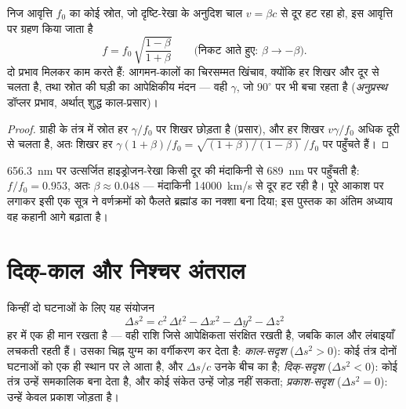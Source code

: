 \begin{proposition}[अनुदैर्घ्य डॉप्लर प्रभाव]\label{prop:b3:relativistic-kinematics:doppler}
निज आवृत्ति $f_0$ का कोई स्रोत, जो दृष्टि-रेखा के अनुदिश चाल
$v = \beta c$ से दूर हट रहा हो, इस आवृत्ति पर ग्रहण किया जाता है
\[
f = f_0\,\sqrt{\frac{1 - \beta}{1 + \beta}}
\qquad
\text{(निकट आते हुए: } \beta \to -\beta\text{)} .
\]
दो प्रभाव मिलकर काम करते हैं: आगमन-कालों का चिरसम्मत खिंचाव, क्योंकि
हर शिखर और दूर से चलता है, तथा स्रोत की घड़ी का आपेक्षिकीय मंदन ---
वही $\gamma$, जो $90^\circ$ पर भी बचा रहता है (\emph{अनुप्रस्थ}
डॉप्लर प्रभाव, अर्थात् शुद्ध काल-प्रसार)।
\end{proposition}

\begin{proof}
ग्राही के तंत्र में स्रोत हर
$\gamma/f_0$ पर शिखर छोड़ता है (प्रसार), और हर शिखर $v\gamma/f_0$ अधिक
दूरी से चलता है, अतः शिखर हर $\gamma(1 + \beta)/f_0 = \sqrt{(1+\beta)/
(1-\beta)}\,/f_0$ पर पहुँचते हैं।
\end{proof}

\begin{example}[मंदाकिनियों का दूर हटना]\label{ex:b3:relativistic-kinematics:redshift}
\qty{656.3}{nm} पर उत्सर्जित हाइड्रोजन-रेखा किसी दूर की मंदाकिनी से
\qty{689}{nm} पर पहुँचती है: $f/f_0 = 0.953$, अतः $\beta \approx 0.048$ ---
मंदाकिनी \qty{14000}{km/s} से दूर हट रही है। पूरे आकाश पर लगाकर इसी
एक सूत्र ने वर्णक्रमों को फैलते ब्रह्मांड का नक्शा बना दिया; इस पुस्तक
का अंतिम अध्याय वह कहानी आगे बढ़ाता है।
\end{example}

\section{दिक्-काल और निश्चर अंतराल}

\begin{theorem}[निश्चर अंतराल]\label{thm:b3:relativistic-kinematics:interval}
किन्हीं दो घटनाओं के लिए यह संयोजन
\[
\Delta s^2 = c^2\,\Delta t^2 - \Delta x^2 - \Delta y^2 - \Delta z^2
\]
हर  में एक ही मान रखता है --- वही राशि जिसे
आपेक्षिकता संरक्षित रखती है, जबकि काल और लंबाइयाँ लचकती रहती हैं।
उसका चिह्न युग्म का वर्गीकरण कर देता है:
\emph{काल-सदृश} ($\Delta s^2 > 0$): कोई तंत्र दोनों घटनाओं को
एक ही स्थान पर ले आता है, और $\Delta s/c$ उनके बीच का  है;
\emph{दिक्-सदृश} ($\Delta s^2 < 0$): कोई तंत्र उन्हें
समकालिक बना देता है, और कोई संकेत उन्हें जोड़ नहीं सकता; \emph{प्रकाश-सदृश}
($\Delta s^2 = 0$): उन्हें केवल प्रकाश जोड़ता है।
\end{theorem}


